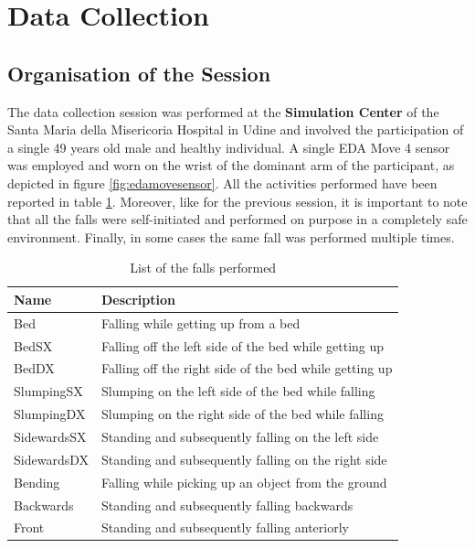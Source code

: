 \newpage

\section{Data Collection}\label{sec:edamove4-data-collection}

\subsection{Organisation of the Session}\label{subsec:session-org}

The data collection session was performed at the \textbf{Simulation Center} of the Santa Maria della Misericoria Hospital in Udine and involved the participation of a single 49 years old male and healthy individual. A single EDA Move 4 sensor was employed and worn on the wrist of the dominant arm of the participant, as depicted in figure \ref{fig:edamovesensor}. All the activities performed have been reported in table \ref{toc:falls-performed-edamove}. Moreover, like for the previous session, it is important to note that all the falls were self-initiated and performed on purpose in a completely safe environment. Finally, in some cases the same fall was performed multiple times.

\begin{table}[H]
\centering
\begin{tabular}{ll}
    \hline
    Name         & Description \\
    \hline
    Bed          & Falling while getting up from a bed \\
    BedSX        & Falling off the left side of the bed while getting up\\
    BedDX        & Falling off the right side of the bed while getting up \\
    SlumpingSX   & Slumping on the left side of the bed while falling  \\
    SlumpingDX   & Slumping on the right side of the bed while falling  \\
    SidewardsSX  & Standing and subsequently falling on the left side \\ 
    SidewardsDX  & Standing and subsequently falling on the right side \\ 
    Bending      & Falling while picking up an object from the ground \\ 
    Backwards    & Standing and subsequently falling backwards \\
    Front        & Standing and subsequently falling anteriorly  \\
    \hline
\end{tabular}
\caption{List of the falls performed}
\label{toc:falls-performed-edamove}
\end{table}

